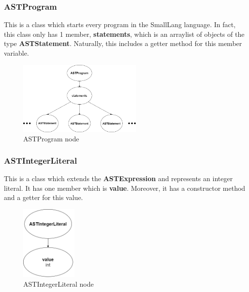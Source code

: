 \documentclass{article}
\begin{document}
					\subsubsection{ASTProgram}
					
					This is a class which starts every program in the SmallLang language. In fact, this class only has 1 member, \textbf{statements}, which is an arraylist of objects of the type \textbf{ASTStatement}. Naturally, this includes a getter method for this member variable.
					
					\begin{figure}[H]
					\centering
			 			\includegraphics[width=0.55\textwidth]{astprogram.png}
			  			\caption{ASTProgram node}
			  			\label{fig:astprogram}
					\end{figure}
			
					
					
					\subsubsection{ASTIntegerLiteral}
					
					This is a class which extends the \textbf{ASTExpression} and represents an integer literal. It has one member which is \textbf{value}. Moreover, it has a constructor method and a getter for this value.
					
					
							\begin{figure}[H]
					\centering
			 			\includegraphics[width=0.25\textwidth]{astintegerlit.png}
			  			\caption{ASTIntegerLiteral node}
			  			\label{fig:astintegerlit}
					\end{figure}
					
\end{document}
